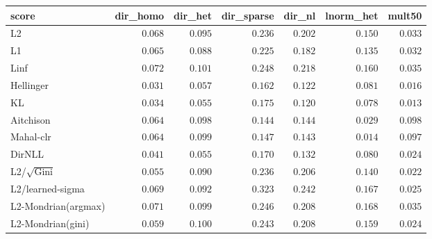 \begin{tabular}{lrrrrrr}
\toprule
score & dir\_homo & dir\_het & dir\_sparse & dir\_nl & lnorm\_het & mult50 \\
\midrule
L2 & $0.068$ & $0.095$ & $0.236$ & $0.202$ & $0.150$ & $0.033$ \\
L1 & $0.065$ & $0.088$ & $0.225$ & $0.182$ & $0.135$ & $0.032$ \\
Linf & $0.072$ & $0.101$ & $0.248$ & $0.218$ & $0.160$ & $0.035$ \\
Hellinger & $\mathbf{0.031}$ & $0.057$ & $0.162$ & $0.122$ & $0.081$ & $0.016$ \\
KL & $0.034$ & $0.055$ & $0.175$ & $\mathbf{0.120}$ & $0.078$ & $\mathbf{0.013}$ \\
Aitchison & $0.064$ & $0.098$ & $\mathbf{0.144}$ & $0.144$ & $0.029$ & $0.098$ \\
Mahal-clr & $0.064$ & $0.099$ & $0.147$ & $0.143$ & $\mathbf{0.014}$ & $0.097$ \\
DirNLL & $0.041$ & $\mathbf{0.055}$ & $0.170$ & $0.132$ & $0.080$ & $0.024$ \\
L2/$\sqrt{\mathrm{Gini}}$ & $0.055$ & $0.090$ & $0.236$ & $0.206$ & $0.140$ & $0.022$ \\
L2/learned-sigma & $0.069$ & $0.092$ & $0.323$ & $0.242$ & $0.167$ & $0.025$ \\
L2-Mondrian(argmax) & $0.071$ & $0.099$ & $0.246$ & $0.208$ & $0.168$ & $0.035$ \\
L2-Mondrian(gini) & $0.059$ & $0.100$ & $0.243$ & $0.208$ & $0.159$ & $0.024$ \\
\bottomrule
\end{tabular}